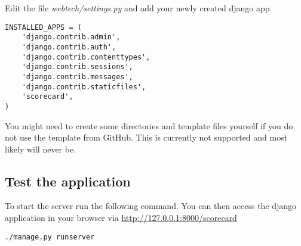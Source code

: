 Edit the file \emph{webtech/settings.py} and add your newly created django app.

\begin{lstlisting}[style=Python, caption=Register application, label=lst:register_app]
INSTALLED_APPS = (
    'django.contrib.admin',
    'django.contrib.auth',
    'django.contrib.contenttypes',
    'django.contrib.sessions',
    'django.contrib.messages',
    'django.contrib.staticfiles',
    'scorecard',
)
\end{lstlisting}

You might need to create some directories and template files yourself if you do not use the template from GitHub. This is currently not supported and most likely will never be.

\subsection{Test the application}
To start the server run the following command. You can then access the django application in your browser via \url{http://127.0.0.1:8000/scorecard}
\begin{lstlisting}[style=Bash, caption=Run development server, label=lst:run_server]
./manage.py runserver
\end{lstlisting}